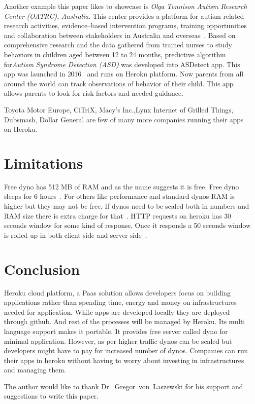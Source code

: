  Another example this paper likes to showcase is \textit{Olga Tennison 
 Autism Research Center (OATRC), Australia}. This center provides a
 platform for autism related research activities, evidence--based
 intervention programs, training opportunities and collaboration
 between stakeholders in Australia and
 overseas~\cite{hid-sp18-415-www-customers-heroku-com}. Based on
 comprehensive research and the data gathered from trained nurses
 to study behaviors in children aged between 12 to 24 months, predictive
 algorithm for\textit{Autism Syndrome Detection (ASD)}
 was developed into ASDetect app. This app was launched in 
 2016~\cite{hid-sp18-415-www-customers-heroku-com} and runs on Heroku platform.
 Now parents
 from all around the world can track observations of behavior of their child.
 This app allows parents to look for risk factors and needed guidance.

 Toyota Motor Europe, CiTriX, Macy's Inc.,Lynx Internet of Grilled Things,
 Dubsmash, Dollar General are few of many more companies running their apps
 on Heroku.


\section{Limitations}

 Free dyno has 512 MB of RAM and as the name suggests it is free. Free dyno
 sleeps for 6 hours~\cite{hid-sp18-415-www-how-heroku-works}. For others like performance
 and standard dynos RAM is higher but they may not be free. If dynos need to
 be scaled both in numbers and RAM size there is extra charge for
 that~\cite{hid-sp18-415-www-how-heroku-works}. HTTP requests on heroku has 30 seconds
 window for some kind of response. Once it responds a 50 seconds window is
 rolled up in both client side and server side~\cite{hid-sp18-415-www-devcenter-herokulimits}.

\section{Conclusion}

 Heroku cloud platform, a Paas solution allows developers focus on building 
 applications rather than spending time, energy and money on infrastructures
 needed for application. While apps are developed locally they are deployed
 through github. And rest of the processes will be managed by Heroku. Its
 multi language support makes it portable. It provides free server called dyno
 for minimal application. However, as per higher traffic dynos can be scaled but
 developers might have to pay for increased number of dynos. Companies can run
 their apps in heroku without having to worry about investing in infrastructures
 and managing them.


\begin{acks}

  The author would like to thank Dr.~Gregor~von~Laszewski for his
  support and suggestions to write this paper.

\end{acks}


 


